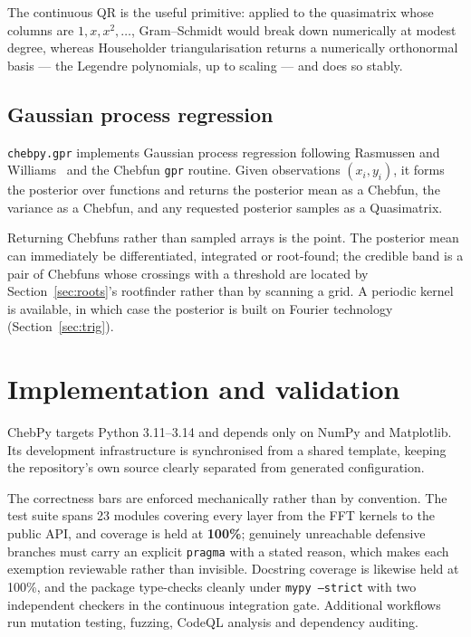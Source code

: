 \documentclass[11pt,a4paper]{article}
\newcommand{\code}[1]{\texttt{#1}}
\begin{document}
The continuous QR is the useful primitive: applied to the quasimatrix whose
columns are $1, x, x^2, \ldots$, Gram--Schmidt would break down numerically at
modest degree, whereas Householder triangularisation returns a numerically
orthonormal basis --- the Legendre polynomials, up to scaling --- and does so
stably.

\subsection{Gaussian process regression}
\label{sec:gpr}

\code{chebpy.gpr} implements Gaussian process regression following Rasmussen
and Williams~\cite{rasmussen2006} and the Chebfun \code{gpr} routine. Given
observations $(x_i, y_i)$, it forms the posterior over functions and returns
the posterior mean as a Chebfun, the variance as a Chebfun, and any requested
posterior samples as a Quasimatrix.

Returning Chebfuns rather than sampled arrays is the point. The posterior mean
can immediately be differentiated, integrated or root-found; the credible band
is a pair of Chebfuns whose crossings with a threshold are located by
Section~\ref{sec:roots}'s rootfinder rather than by scanning a grid. A periodic
kernel is available, in which case the posterior is built on Fourier technology
(Section~\ref{sec:trig}).

\section{Implementation and validation}
\label{sec:engineering}

ChebPy targets Python 3.11--3.14 and depends only on NumPy and Matplotlib. Its
development infrastructure is synchronised from a shared template, keeping the
repository's own source clearly separated from generated configuration.

The correctness bars are enforced mechanically rather than by convention. The
test suite spans 23 modules covering every layer from the FFT kernels to the
public API, and coverage is held at \textbf{100\%}; genuinely unreachable
defensive branches must carry an explicit \code{pragma} with a stated reason,
which makes each exemption reviewable rather than invisible. Docstring coverage
is likewise held at 100\%, and the package type-checks cleanly under
\code{mypy --strict} with two independent checkers in the continuous
integration gate. Additional workflows run mutation testing, fuzzing,
CodeQL analysis and dependency auditing.
\end{document}
